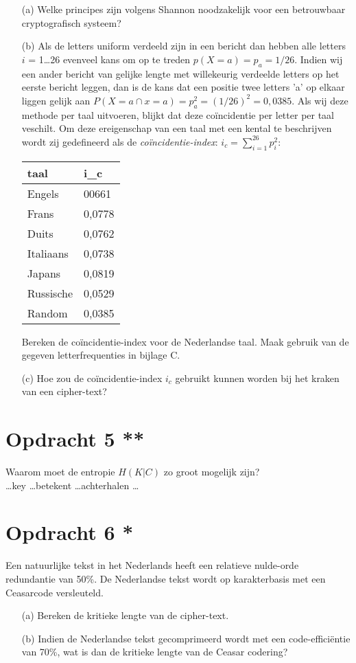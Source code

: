 \begin{itemize}
  \item[(a)] Welke principes zijn volgens Shannon noodzakelijk voor een betrouwbaar cryptografisch systeem?
  \item[(b)] Als de letters uniform verdeeld zijn in een bericht dan hebben alle letters $i$ = 1\ldots26 evenveel kans om op te treden $p(X=a)=p_a=1/26$. Indien wij een ander bericht van gelijke lengte met willekeurig verdeelde letters op het eerste bericht leggen, dan is de kans dat een positie twee letters 'a' op elkaar liggen gelijk aan $P(X=a\cap x = a)=p_a^2=(1/26)^2=0,0385$. Als wij deze methode per taal uitvoeren, blijkt dat deze co\"{i}ncidentie per letter per taal veschilt. Om deze ereigenschap van een taal met een kental te beschrijven wordt zij gedefineerd als de \emph{co\"{i}ncidentie-index}: $i_c=\sum ^{26}_{i=1} p^2_i$:

\begin{center}
\begin{tabular}{ll}
  taal & i_c \\
  \hline
  Engels & 00661 \\ 
  Frans & 0,0778 \\
  Duits & 0,0762 \\
  Italiaans & 0,0738 \\
  Japans & 0,0819 \\
  Russische & 0,0529 \\
  Random & 0,0385 \\
\end{tabular}
\end{center}

Bereken de co\"{i}ncidentie-index voor de Nederlandse taal. Maak gebruik van de gegeven letterfrequenties in bijlage C.
   \item[(c)] Hoe zou de co\"{i}ncidentie-index $i_c$ gebruikt kunnen worden bij het kraken van een cipher-text?
\end{itemize}

\section{Opdracht 5 **}
Waarom moet de entropie $H(K|C)$ zo groot mogelijk zijn? \\

\ldots key \ldots betekent \ldots achterhalen \ldots

\section{Opdracht 6 *}
Een natuurlijke tekst in het Nederlands heeft een relatieve nulde-orde redundantie van 50\%. De Nederlandse tekst wordt op karakterbasis met een Ceasarcode versleuteld.
\begin{itemize}
  \item[(a)] Bereken de kritieke lengte van de cipher-text.
  \item[(b)] Indien de Nederlandse tekst gecomprimeerd wordt met een code-effici\"{e}ntie van 70\%, wat is dan de kritieke lengte van de Ceasar codering?
\end{itemize}
